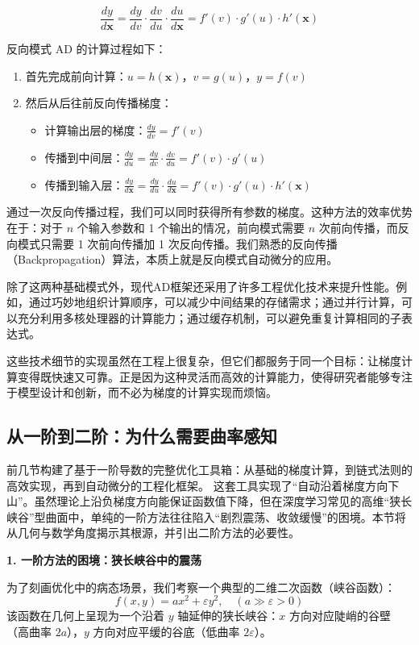 $$\frac{dy}{d\mathbf{x}} = \frac{dy}{dv} \cdot \frac{dv}{du} \cdot \frac{du}{d\mathbf{x}} = f'(v) \cdot g'(u) \cdot h'(\mathbf{x})$$

反向模式 AD 的计算过程如下：
\begin{enumerate}
\item 首先完成前向计算：$u = h(\mathbf{x})$，$v = g(u)$，$y = f(v)$
\item 然后从后往前反向传播梯度：
\begin{itemize}
\item 计算输出层的梯度：$\frac{dy}{dv} = f'(v)$
\item 传播到中间层：$\frac{dy}{du} = \frac{dy}{dv} \cdot \frac{dv}{du} = f'(v) \cdot g'(u)$
\item 传播到输入层：$\frac{dy}{d\mathbf{x}} = \frac{dy}{du} \cdot \frac{du}{d\mathbf{x}} = f'(v) \cdot g'(u) \cdot h'(\mathbf{x})$
\end{itemize}
\end{enumerate}

通过一次反向传播过程，我们可以同时获得所有参数的梯度。这种方法的效率优势在于：对于 $n$ 个输入参数和 1 个输出的情况，前向模式需要 $n$ 次前向传播，而反向模式只需要 1 次前向传播加 1 次反向传播。我们熟悉的反向传播（Backpropagation）算法，本质上就是反向模式自动微分的应用。

除了这两种基础模式外，现代AD框架还采用了许多工程优化技术来提升性能。例如，通过巧妙地组织计算顺序，可以减少中间结果的存储需求；通过并行计算，可以充分利用多核处理器的计算能力；通过缓存机制，可以避免重复计算相同的子表达式。

这些技术细节的实现虽然在工程上很复杂，但它们都服务于同一个目标：让梯度计算变得既快速又可靠。正是因为这种灵活而高效的计算能力，使得研究者能够专注于模型设计和创新，而不必为梯度的计算实现而烦恼。

\subsection{从一阶到二阶：为什么需要曲率感知}

前几节构建了基于一阶导数的完整优化工具箱：从基础的梯度计算，到链式法则的高效实现，再到自动微分的工程化框架。 这套工具实现了“自动沿着梯度方向下山”。虽然理论上沿负梯度方向能保证函数值下降，但在深度学习常见的高维“狭长峡谷”型曲面中，单纯的一阶方法往往陷入“剧烈震荡、收敛缓慢”的困境。本节将从几何与数学角度揭示其根源，并引出二阶方法的必要性。

\textbf{1. 一阶方法的困境：狭长峡谷中的震荡}

为了刻画优化中的病态场景，我们考察一个典型的二维二次函数（峡谷函数）：
\begin{equation}\label{eq:quadratic_eqn}
f(x,y) = a{x}^2 + \varepsilon y^2, \quad (a \gg \varepsilon > 0)
\end{equation}
该函数在几何上呈现为一个沿着 $y$ 轴延伸的狭长峡谷：$x$ 方向对应陡峭的谷壁（高曲率 $2a$），$y$ 方向对应平缓的谷底（低曲率 $2\varepsilon$）。

